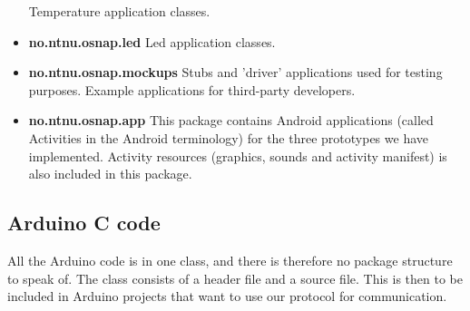 \begin{itemize}
		Temperature application classes.
	\item \textbf{no.ntnu.osnap.led}\newline
		Led application classes.
	\item \textbf{no.ntnu.osnap.mockups}  \newline
		Stubs and 'driver' applications used for testing purposes.
		Example applications for third-party developers.
	\item \textbf{no.ntnu.osnap.app} \newline
		This package contains Android applications (called Activities in the Android terminology) for the three prototypes
		we have implemented. Activity resources (graphics, sounds and activity manifest) is also included in this package.
\end{itemize}

\subsection{Arduino C code}
All the Arduino code is in one class, and there is therefore no package structure to speak of.
The class consists of a header file and a source file. This is then to be included in Arduino projects
that want to use our protocol for communication.
